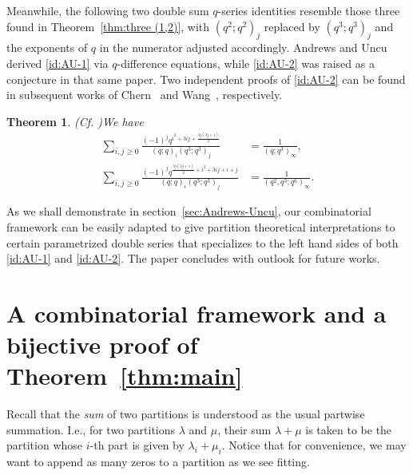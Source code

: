 \documentclass[11pt,reqno]{amsart}
\numberwithin{equation}{section}
\theoremstyle{plain}
\newtheorem{theorem}{Theorem}[section]
\theoremstyle{definition}
\def\la{\lambda}
\begin{document}
Meanwhile, the following two double sum $q$-series identities resemble those three found in Theorem~\ref{thm:three (1,2)}, with $(q^2;q^2)_j$ replaced by $(q^3;q^3)_j$ and the exponents of $q$ in the numerator adjusted accordingly. Andrews and Uncu \cite{AU23} derived \eqref{id:AU-1} via $q$-difference equations, while \eqref{id:AU-2} was raised as a conjecture in that same paper. Two independent proofs of \eqref{id:AU-2} can be found in subsequent works of Chern~\cite{che23} and Wang~\cite{wan23}, respectively.
 
\begin{theorem}(Cf. \cite[Th. 1.1 and Conj. 1.2]{AU23})\label{thm:AU}
We have
\begin{align}
\sum_{i, j \ge 0} \frac{(-1)^j q^{i^2+3ij+\frac{3j(3j+1)}{2}}}{(q;q)_i (q^3;q^3)_j} &=\frac{1}{(q;q^3)_{\infty}},\label{id:AU-1}\\
\sum_{i, j \ge 0} \frac{(-1)^j q^{\frac{3 j(3 j+1)}{2}+i^2+3 i j+i+j}}{(q ; q)_i(q^3 ; q^3)_j} &=\frac{1}{(q^2, q^3 ; q^6)_{\infty}}.\label{id:AU-2}
\end{align}
\end{theorem}

As we shall demonstrate in section~\ref{sec:Andrews-Uncu}, our combinatorial framework can be easily adapted to give partition theoretical interpretations to certain parametrized double series that specializes to the left hand sides of both \eqref{id:AU-1} and \eqref{id:AU-2}. The paper concludes with outlook for future works.





\section{A combinatorial framework and a bijective proof of Theorem~\ref{thm:main}}\label{sec:bij}
Recall that the {\it sum} of two partitions is understood as the usual partwise summation. I.e., for two partitions $\la$ and $\mu$, their sum $\la+\mu$ is taken to be the partition whose $i$-th part is given by $\la_i+\mu_i$. Notice that for convenience, we may want to append as many zeros to a partition as we see fitting.
\end{document}
